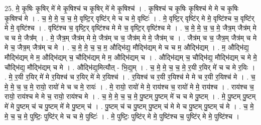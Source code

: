 \documentclass[17pt]{extarticle}
\begin{document}
25. मे॒ कृ॒षिः कृ॒षिर् मे॑ मे कृ॒षिश्च॑ च कृ॒षिर् मे॑ मे कृ॒षिश्च॑ । . कृ॒षिश्च॑ च कृ॒षिः कृ॒षिश्च॑ मे मे च कृ॒षिः कृ॒षिश्च॑ मे । . च॒ मे॒ मे॒ च॒ च॒ मे॒ वृष्टि॒र् वृष्टि॑र् मे च च मे॒ वृष्टिः॑ । . मे॒ वृष्टि॒र् वृष्टि॑र् मे मे॒ वृष्टि॑श्च च॒ वृष्टि॑र् मे मे॒ वृष्टि॑श्च । . वृष्टि॑श्च च॒ वृष्टि॒र् वृष्टि॑श्च मे मे च॒ वृष्टि॒र् वृष्टि॑श्च मे । . च॒ मे॒ मे॒ च॒ च॒ मे॒ जैत्र॒म् जैत्र॑म् मे च च मे॒ जैत्र᳚म् । . मे॒ जैत्र॒म् जैत्र॑म् मे मे॒ जैत्र॑म् च च॒ जैत्र॑म् मे मे॒ जैत्र॑म् च । . जैत्र॑म् च च॒ जैत्र॒म् जैत्र॑म् च मे मे च॒ जैत्र॒म् जैत्र॑म् च मे । . च॒ मे॒ मे॒ च॒ च॒ म॒ औद्भि॑द्य॒ मौद्भि॑द्यम् मे च च म॒ औद्भि॑द्यम् । . म॒ औद्भि॑द्य॒ मौद्भि॑द्यम् मे म॒ औद्भि॑द्यम् च॒ चौद्भि॑द्यम् मे म॒ औद्भि॑द्यम् च । . औद्भि॑द्यम् च॒ चौद्भि॑द्य॒ मौद्भि॑द्यम् च मे मे॒ चौद्भि॑द्य॒ मौद्भि॑द्यम् च मे । . औद्भि॑द्य॒मित्यौत् - भि॒द्य॒म् । . च॒ मे॒ मे॒ च॒ च॒ मे॒ र॒यी र॒यिर् मे॑ च च मे र॒यिः । . मे॒ र॒यी र॒यिर् मे॑ मे र॒यिश्च॑ च र॒यिर् मे॑ मे र॒यिश्च॑ । . र॒यिश्च॑ च र॒यी र॒यिश्च॑ मे मे च र॒यी र॒यिश्च॑ मे । . च॒ मे॒ मे॒ च॒ च॒ मे॒ रायो॒ रायो॑ मे च च मे॒ रायः॑ । . मे॒ रायो॒ रायो॑ मे मे॒ राय॑श्च च॒ रायो॑ मे मे॒ राय॑श्च । . राय॑श्च च॒ रायो॒ राय॑श्च मे मे च॒ रायो॒ राय॑श्च मे । . च॒ मे॒ मे॒ च॒ च॒ मे॒ पु॒ष्टम् पु॒ष्टम् मे॑ च च मे पु॒ष्टम् । . मे॒ पु॒ष्टम् पु॒ष्टम् मे॑ मे पु॒ष्टम् च॑ च पु॒ष्टम् मे॑ मे पु॒ष्टम् च॑ । . पु॒ष्टम् च॑ च पु॒ष्टम् पु॒ष्टम् च॑ मे मे च पु॒ष्टम् पु॒ष्टम् च॑ मे । . च॒ मे॒ मे॒ च॒ च॒ मे॒ पुष्टिः॒ पुष्टि॑र् मे च च मे॒ पुष्टिः॑ । . मे॒ पुष्टिः॒ पुष्टि॑र् मे मे॒ पुष्टि॑श्च च॒ पुष्टि॑र् मे मे॒ पुष्टि॑श्च । \newline
\end{document}
